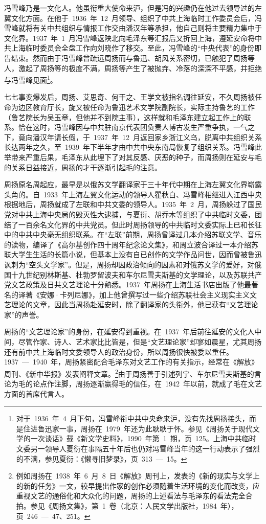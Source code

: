 冯雪峰乃是一文化人。他虽衔重大使命来沪，但是冯的兴趣仍在他过去领导过的左翼文化方面。在他于~1936~年~12~月领导、组织了中共上海临时工作委员会后，冯雪峰就将有关中共组织与情报工作交由潘汉年等承担，他自己则将主要精力集中于文化界。1937~年~1~月冯雪峰返陕北向毛泽东等汇报后又折回上海，遵延安命将中共上海临时委员会全盘工作向刘晓作了移交。至此，冯雪峰的“中央代表”的身份即告结束。然而由于冯雪峰曾疏远周扬而与鲁迅、胡风关系密切，已触犯了周扬等人，激起了周扬等的极度不满，周扬等产生了被抛弃、冷落的深深不平感，并拒绝与冯雪峰见面\footnote{对于~1936~年~4~月下旬，冯雪峰衔中共中央命来沪，没有先找周扬接头，而是住进鲁迅家一事，周扬在~1979~年还为此耿耿于怀。参见《周扬关于现代文学的一次谈话》载《新文学史料》，1990~年第~1~期，页~125。上海中共临时文委另一领导人夏衍在事隔五十年后也仍对冯雪峰当年的这一行动表示了强烈的不满，参见夏衍：《懒寻旧梦录》，页~313~—~15。}。

七七事变爆发后，周扬、艾思奇、何干之、王学文被指名调往延安，不久周扬被任命为边区教育厅长，旋又被任命为鲁迅艺术文学院副院长，实际主持鲁艺的工作（鲁艺院长为吴玉章，但他并不到院主事），这样就和毛泽东建立起工作上的联系。恰在这时，冯雪峰因与中共驻南京代表团负责人博古发生严重争执，一气之下，竟向潘汉年请长假，于~1937~年~12~月返回家乡浙江义乌，脱离中共组织关系长达两年之久，至~1939~年下半年才由中共中央东南局恢复了组织关系。冯雪峰此举带来严重后果，毛泽东从此埋下了对其反感、厌恶的种子，而周扬则在延安与毛的关系日益接近，周扬的才干逐渐引起毛的注意。

周扬原名周起应，最早是以俄苏文学翻译家于三十年代中期在上海左翼文化界崭露头角的。自~1933~年上海左翼文化运动的领导人瞿秋白、冯雪峰相继进入江西中央根据地后，周扬就成了左联和中共文委的领导人。1935~年~2~月，周扬躲过了国民党对中共上海中央局的毁灭性大逮捕，与夏衍、胡乔木等组织了中共临时文委，团结了一百余名文化界的中共党员。但此时周扬领导的中共临时文委实际上已和长征中的中共中央毫无组织联系。在“左联”前期，周扬曾译过几本介绍苏联文学、音乐的读物，编译了《高尔基创作四十周年纪念论文集》，和周立波合译过一本介绍苏联大学生生活的长篇小说，但基本上没有自已创作的文学作品问世，因而曾被鲁迅讽刺为“空头文学家”。但是，周扬却因政治倾向的因素和对俄苏文学的爱好，对俄国十九世纪别林斯基、杜勃罗留波夫和车尔尼雪夫斯基的文学理论，以及苏联共产党文艺政策及日共文艺理论十分熟悉。1937~年周扬在上海生活书店出版了他最著名的译著《安娜·卡列尼娜》，加上他曾撰写过一些介绍苏联社会主义现实主义文艺理论的文章，因此当周扬赴延安时，除了翻译家的头衔外，他已获有“文艺理论家”的声誉。

周扬的“文艺理论家”的身份，在延安得到重视。在~1937~年后前往延安的文化人中间，尽管作家、诗人、艺术家比比皆是，但是“文艺理论家”却寥如晨星，尤其周扬还有前中共上海临时文委领导人的政治身份，所以周扬很快被委以重任。1937~—~1940~年，周扬紧密配合毛泽东对文艺工作的有关指示，经常在《解放》周刊、《新中华报》发表阐释文章。\footnote{例如周扬在~1938~年~6~月~8~日《解放》周刊上，发表的《新的现实与文学上的新的任务》一文，较早提出作家的创作必须随着生活环境的变化而改变，应重视文艺的通俗化和大众化的问题，周扬的上述看法与毛泽东的看法完全合拍。参见《周扬文集》，第~1~卷（北京：人民文学出版社，1984~年），页~246~—~47、251。}由于周扬善于引述列宁、车尔尼雪夫斯基的言论为毛的论点作注脚，周扬逐渐赢得毛的信任，在~1942~年以前，就成了毛在文艺方面的首席代言人。

